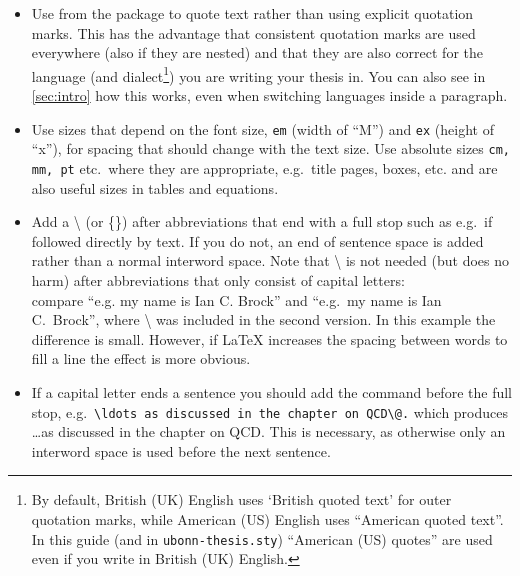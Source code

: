 \begin{itemize}
\item Use  from the  package to
  quote text rather than using explicit quotation marks. This has the
  advantage that consistent quotation marks are used everywhere (also
  if they are nested) and that they are also correct for the language
  (and dialect\footnote{%
    By default, British (UK) English
    uses `British quoted text' for outer quotation marks,
    while American (US) English
    uses \foreignquote{USenglish}{American quoted text}. In this guide
    (and in \texttt{ubonn-thesis.sty})
    \foreignquote{USenglish}{American (US) quotes} are used even if you
    write in British (UK) English.})
  you are writing your thesis in.
  You can also see in \cref{sec:intro} how this works, even
  when switching languages inside a paragraph.

\item Use sizes that depend on the font size, \texttt{em}
  (width of \enquote{M}) and \texttt{ex} (height of \enquote{x}), for
  spacing that should change with the text size. Use absolute sizes
  \texttt{cm, mm, pt} etc.\ where they are appropriate, e.g.\ title
  pages, boxes, etc.  and
   are also useful sizes in tables and
  equations.

\item Add a \textbackslash{} (or \{\}) after abbreviations that end with a full
  stop such as e.g.\ if followed directly by text. If you do not, an
  end of sentence space is added rather than a normal interword
  space. Note that \textbackslash{} is not needed (but does no harm)
  after abbreviations that only consist of capital letters:\\
  compare \enquote{e.g. my name is Ian C. Brock} %
  and \enquote{e.g.\ my name is Ian C.\ Brock},
  where \textbackslash{} was included in the second version. In this
  example the difference is small. However, if \LaTeX{} increases the
  spacing between words to fill a line the effect is more obvious.

\item If a capital letter ends a sentence you should add the
  command  before the full stop, e.g.\
  \verb|\ldots as discussed in the chapter on QCD\@.|
  which produces \ldots as discussed in the chapter on QCD\@.
  This is necessary, as otherwise only an interword space is used
  before the next sentence.


\end{itemize}
